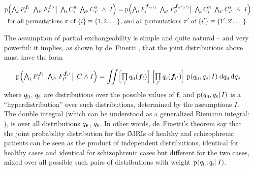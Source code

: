 \documentclass[%
]{frontiersSCNS-nologo} %
\newcommand*{\sect}{\S} %
\newcommand*{\di}{\mathrm{d}}%
\newcommand*{\pf}{\mathrm{p}}%
\renewcommand*{\|}{\mathpunct{|}}%
\newcommand*{\bigcond}{\mathpunct{\big|\ }}%
\newcommand*{\Land}{\mathbin{\ \land\ }}
\let\oldprod\prod
\renewcommand*{\prod}{\mathop{\textstyle\oldprod}}
\newcommand*{\tland}{\mathop{\textstyle\bigwedge}\nolimits}
\DeclarePairedDelimiter\set{\{}{\}}%
\newcommand*{\yH}{C}
\newcommand*{\yhu}{\textsc{h}}
\newcommand*{\yhd}{\textsc{s}}
\newcommand*{\yF}{F}
\newcommand*{\yf}{\bm{f}}
\newcommand*{\yph}{q_{\yhu}}
\newcommand*{\yps}{q_{\yhd}}
\newcommand*{\yI}{I}
\begin{document}
\begin{multline}
  \label{eq:partial_exchangeability_example}
    \pf\Bigl( \tland_i\yF_{i}^{\yf_{i}}\ 
    \tland_{i'}\yF_{i'}^{\yf_{i'}}
    \bigcond
    \tland_i\yH_{i}^{\yhu}\ 
    \tland_{i'}\yH_{i'}^{\yhd} \Land \yI \Bigr) =
    \pf\Bigl( \tland_i\yF_{i}^{\yf_{\pi(i)}}\ 
    \tland_{i'}\yF_{i'}^{\yf_{\pi'(i')}}
    \bigcond
    \tland_i\yH_{i}^{\yhu}\ 
    \tland_{i'}\yH_{i'}^{\yhd} \Land \yI \Bigr)
  \\
  \text{for all permutations $\pi$ of $\set{i}\equiv\set{1,2,\dotsc}$, and all permutations
    $\pi'$ of $\set{i'}\equiv\set{1',2',\dotsc}$.}
\end{multline}


The assumption of partial exchangeability is simple and quite natural --
and very powerful: it implies, as shown by de~Finetti
\citetext{\citeyear{definetti1938}; \citealp[\sect~3]{diaconis1988};
  \citealp[\sect~4.6]{bernardoetal1994_r2000}}, that the joint
distributions above must have the form

\begin{equation}
  \label{eq:partial_exchangeability_theorem}
    \pf\Bigl(\tland_i \yF_{i}^{\yf_{i}}\ 
    \tland_{i'}\yF_{i'}^{\yf_{i'}}
    \bigcond
    \yH \land \yI \Bigr) =
    \iint \Bigl[ \prod_{i} \yph(\yf_{i})\Bigr]\,
    \Bigl[ \prod_{i'} \yps(\yf_{i'})\Bigr]\;
    \pf(\yph, \yps \|\yI)\;
    \di\yph\,\di\yps
\end{equation}
where $\yph$, $\yps$ are distributions over the possible values of $\yf$,
and $\pf(\yph,\yps \| \yI)$ is a \enquote{hyperdistribution} over such
distributions, determined by the assumptions $\yI$. The double integral
(which can be understood as a generalized Riemann integral:
\citealp{lamoreauxetal1998,swartz2001,kurtzetal2004}), is over all
distributions $\yph$, $\yps$. In other words, de~Finetti's theorem say that
the joint probability distribution for the fMRIs of healthy and
schizophrenic patients can be seen as the product of independent
distributions, identical for healthy cases and identical for schizophrenic
cases but different for the two cases, mixed over all possible such pairs
of distributions with weight $\pf(\yph,\yps \| \yI)$.
\end{document}
